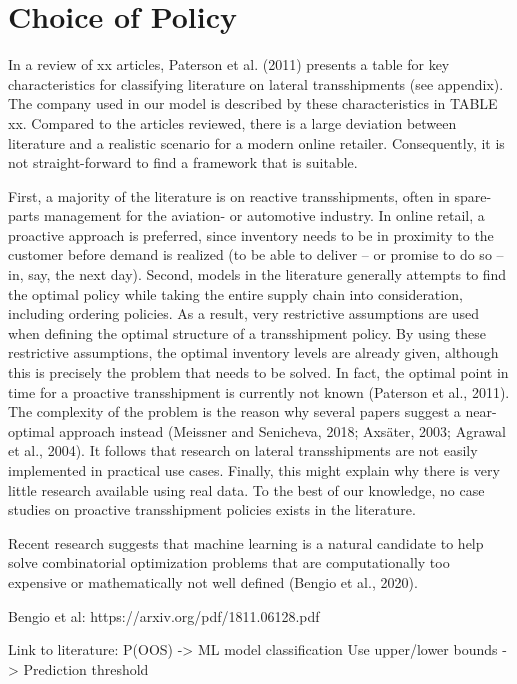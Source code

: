 \documentclass[../../main.tex]{subfiles}
\begin{document}

\section{Choice of Policy}

In a review of xx articles, Paterson et al. (2011) presents a table for key characteristics for classifying literature on lateral transshipments (see appendix). The company used in our model is described by these characteristics in TABLE xx. Compared to the articles reviewed, there is a large deviation between literature and a realistic scenario for a modern online retailer. Consequently, it is not straight-forward to find a framework that is suitable.

First, a majority of the literature is on reactive transshipments, often in spare-parts management for the aviation- or automotive industry. In online retail, a proactive approach is preferred, since inventory needs to be in proximity to the customer before demand is realized (to be able to deliver – or promise to do so – in, say, the next day). Second, models in the literature generally attempts to find the optimal policy while taking the entire supply chain into consideration, including ordering policies. As a result, very restrictive assumptions are used when defining the optimal structure of a transshipment policy. By using these restrictive assumptions, the optimal inventory levels are already given, although this is precisely the problem that needs to be solved. In fact, the optimal point in time for a proactive transshipment is currently not known (Paterson et al., 2011). The complexity of the problem is the reason why several papers suggest a near-optimal approach instead (Meissner and Senicheva, 2018; Axsäter, 2003; Agrawal et al., 2004). It follows that research on lateral transshipments are not easily implemented in practical use cases. Finally, this might explain why there is very little research available using real data. To the best of our knowledge, no case studies on proactive transshipment policies exists in the literature.
 
Recent research suggests that machine learning is a natural candidate to help solve combinatorial optimization problems that are computationally too expensive or mathematically not well defined (Bengio et al., 2020). 

Bengio et al: https://arxiv.org/pdf/1811.06128.pdf

Link to literature:
P(OOS) -> ML model classification
Use upper/lower bounds -> Prediction threshold
\end{document}
